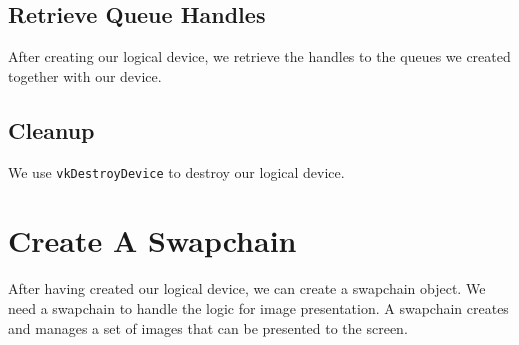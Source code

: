 \begin{minipage}{\linewidth}{\noindent}
    
\end{minipage}

\begin{minipage}{\linewidth}{\noindent}
    
\end{minipage}

\subsection{Retrieve Queue Handles}

After creating our logical device, we retrieve the handles to the
queues we created together with our device.

\begin{minipage}{\linewidth}{\noindent}
    
\end{minipage}

\subsection{Cleanup}

We use \texttt{vkDestroyDevice} to destroy our logical device.

\section{Create A Swapchain}

After having created our logical device, we can create a swapchain object.
We need a swapchain to handle the logic for image presentation.
A swapchain creates and manages a set of images that can be presented to the screen.

\begin{minipage}{\linewidth}{\noindent}
    
\end{minipage}

